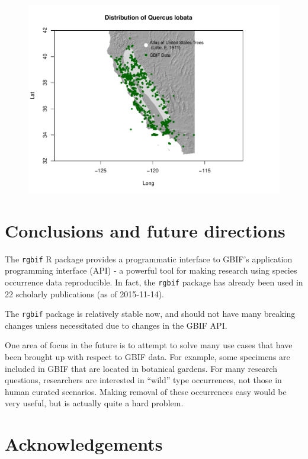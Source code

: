 \documentclass[author-year, review, 11pt]{components/elsarticle} %
\makeatletter
\def\maxwidth{\ifdim\Gin@nat@width>\linewidth\linewidth
\else\Gin@nat@width\fi}
\let\Oldincludegraphics\includegraphics
\renewcommand{\includegraphics}[1]{\Oldincludegraphics[width=\maxwidth]{#1}}
\makeatother
\begin{document}
\begin{figure}[htbp]
\centering
\includegraphics{components/figure/manuscript-unnamed-chunk-37-1.pdf}
\caption{}
\end{figure}

\section{Conclusions and future
directions}\label{conclusions-and-future-directions}

The \texttt{rgbif} R package provides a programmatic interface to GBIF's
application programming interface (API) - a powerful tool for making
research using species occurrence data reproducible. In fact, the
\texttt{rgbif} package has already been used in 22 scholarly
publications (as of 2015-11-14).

The \texttt{rgbif} package is relatively stable now, and should not have
many breaking changes unless necessitated due to changes in the GBIF
API.

One area of focus in the future is to attempt to solve many use cases
that have been brought up with respect to GBIF data. For example, some
specimens are included in GBIF that are located in botanical gardens.
For many research questions, researchers are interested in ``wild'' type
occurrences, not those in human curated scenarios. Making removal of
these occurrences easy would be very useful, but is actually quite a
hard problem.

\section{Acknowledgements}\label{acknowledgements}
\end{document}
